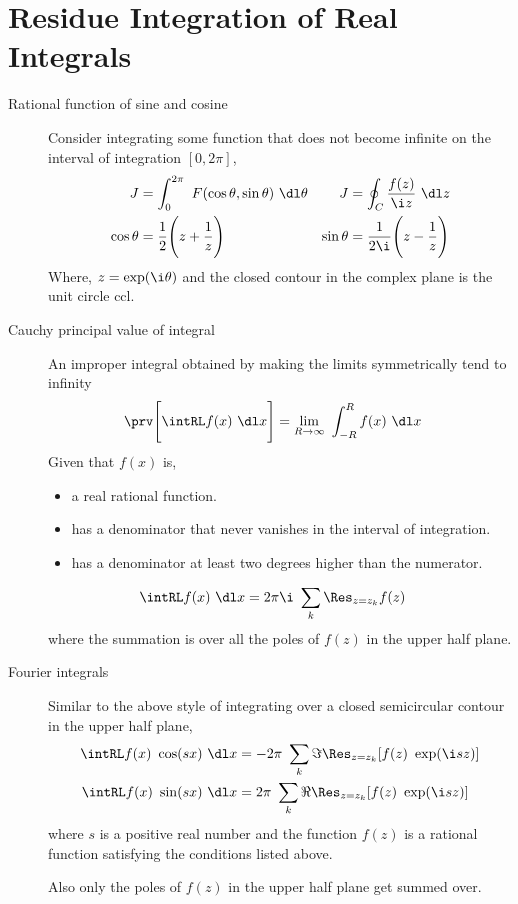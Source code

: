 \section{Residue Integration of Real Integrals}

\begin{description}
    \item[Rational function of sine and cosine] Consider integrating some function
        that does not become infinite on the interval of integration $ [0, 2\pi] $,
        \begin{align}
            J           & = \int_{0}^{2\pi}\ F(\cos \theta, \sin \theta)\ \dl \theta &
            J           & = \oint_{C} \frac{f(z)}{\i z}\ \dl z                         \\
            \cos \theta & = \frac{1}{2} \Bigg( z + \frac{1}{z} \Bigg)                &
            \sin \theta & = \frac{1}{2\i} \Bigg( z - \frac{1}{z} \Bigg)
        \end{align}
        Where, $ z = \exp(\i \theta) $ and the closed contour in the complex plane
        is the unit circle ccl.

    \item[Cauchy principal value of integral] An improper integral obtained by
        making the limits symmetrically tend to infinity
        \begin{align}
            \prv \Bigg[\intRL f(x)\ \dl x\Bigg] & = \lim_{R \to \infty}
            \ \int_{-R}^{R} f(x)\ \dl x
        \end{align}
        Given that $ f(x) $ is,
        \begin{itemize}
            \item a real rational function.
            \item has a denominator that never vanishes in the interval of integration.
            \item has a denominator at least two degrees higher than the numerator.
        \end{itemize}
        \begin{align}
            \intRL f(x)\ \dl x & = 2\pi\i\ \sum_k \Res_{z = z_k} f(z)
        \end{align}
        where the summation is over all the poles of $ f(z) $ in the upper half plane.

    \item[Fourier integrals] Similar to the above style of integrating over a
        closed semicircular contour in the upper half plane,
        \begin{align}
            \intRL f(x)\ \cos(sx)\ \dl x & = -2\pi\ \sum_k \Im {\Res_{z = z_k} [f(z)
            \ \exp(\i sz)]}                                                          \\
            \intRL f(x)\ \sin(sx)\ \dl x & = 2\pi\ \sum_k \Re {\Res_{z = z_k} [f(z)
                    \ \exp(\i sz)]}
        \end{align}
        where $ s $ is a positive real number and the function $ f(z) $ is a rational
        function satisfying the conditions listed above. \par
        Also only the poles of $ f(z) $ in the upper half plane get summed over.


\end{description}
